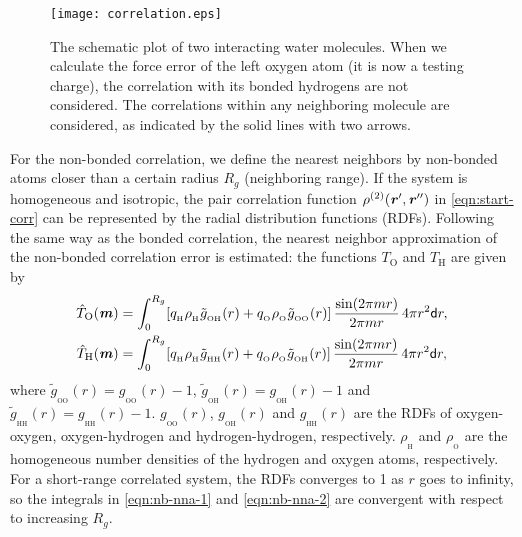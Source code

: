 \documentclass[journal=jacsat,manuscript=article]{achemso}
\newcommand{\recheck}[1]{{\color{black} #1}}
\renewcommand{\v}[1]{\textbf{\textit{#1}}}
\renewcommand{\d}[1]{\textsf{#1}}
\begin{document}
\begin{figure}
  \centering
  \texttt{[image: correlation.eps]}
  \caption{The schematic plot of two interacting water molecules.
    When we calculate the force error of the left oxygen atom (it is now
    a testing charge), the
    correlation with its bonded hydrogens are not considered.
    The correlations within any neighboring molecule are considered,
    as indicated by the solid lines with two arrows.}
  \label{fig:tmp-add0}
\end{figure}

\recheck{
  For the non-bonded correlation,
  we define the nearest neighbors
  by non-bonded atoms closer than a certain radius $R_g$ (neighboring range).
  If the system is homogeneous and isotropic, the pair
  correlation function $\rho^{(2)}(\v r', \v r'')$ in
  \ref{eqn:start-corr} can be represented by the radial
  distribution functions (RDFs).
  Following the same way as the bonded correlation,
  the nearest neighbor approximation of
  the non-bonded correlation error is estimated:
  the functions $T_{\textrm{O}}$ and $T_{\textrm{H}}$
  are given by
  \begin{align}\label{eqn:nb-nna-1}
    \hat T_{\textrm{O}} (\v m)
    &= \int_0^{R_g}
    [q_{_{\textrm{H}}} \rho_{_{\textrm{H}}} \tilde g_{_{\textrm{OH}}}(r)
    +q_{_{\textrm{O}}} \rho_{_{\textrm{O}}} \tilde g_{_{\textrm{OO}}}(r)]
    \,\frac{\sin(2\pi m r)}{2\pi mr}\,4\pi r^2 \d dr,\\\label{eqn:nb-nna-2}
    \hat T_{\textrm{H}} (\v m)
    &= \int_0^{R_g}
    [q_{_{\textrm{H}}} \rho_{_{\textrm{H}}} \tilde g_{_{\textrm{HH}}}(r)
    +q_{_{\textrm{O}}} \rho_{_{\textrm{O}}} \tilde g_{_{\textrm{OH}}}(r)]
    \,\frac{\sin(2\pi m r)}{2\pi mr}\,4\pi r^2 \d dr,
  \end{align}
  where
  $\tilde g_{_{\textrm{OO}}}(r) = g_{_{\textrm{OO}}}(r) - 1$,
  $\tilde g_{_{\textrm{OH}}}(r) = g_{_{\textrm{OH}}}(r) - 1$ and
  $\tilde g_{_{\textrm{HH}}}(r) = g_{_{\textrm{HH}}}(r) - 1$.
  $g_{_{\textrm{OO}}}(r)$, $g_{_{\textrm{OH}}}(r)$ and $g_{_{\textrm{HH}}}(r)$
  are the RDFs of oxygen-oxygen, oxygen-hydrogen and hydrogen-hydrogen,
  respectively. $\rho_{_{\textrm{H}}}$ and $\rho_{_{\textrm{O}}}$ are
  the homogeneous number densities
  of the hydrogen and oxygen atoms, respectively.
  For a short-range correlated system, the RDFs converges to 1
  as $r$ goes to infinity, so the integrals in \ref{eqn:nb-nna-1}
  and \ref{eqn:nb-nna-2} are convergent with respect to
  increasing $R_g$. 

}
\end{document}
